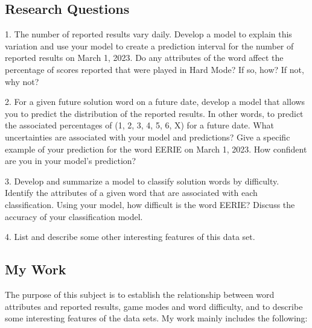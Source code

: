 \documentclass[
  journal=medium,
  manuscript=Report,
  year=2023,
  volume=37,
]{cup-journal}
\begin{document}
\subsection{Research Questions}
    
1. The number of reported results vary daily. Develop a model to explain this variation and use your model to create a prediction interval for the number of reported results on March 1, 2023. Do any attributes of the word affect the percentage of scores reported that were played in Hard Mode? If so, how? If not, why not?

2. For a given future solution word on a future date, develop a model that allows you to predict the distribution of the reported results. In other words, to predict the associated percentages of (1, 2, 3, 4, 5, 6, X) for a future date. What uncertainties are associated with your model and predictions? Give a specific example of your prediction for the word EERIE on March 1, 2023. How confident are you in your model’s prediction?

3. Develop and summarize a model to classify solution words by difficulty. Identify the attributes of a given word that are associated with each classification. Using your model, how difficult is the word EERIE? Discuss the accuracy of your classification model.

4. List and describe some other interesting features of this data set.

\subsection{My Work}

The purpose of this subject is to establish the relationship between word attributes and reported results, game modes and word difficulty, and to describe some interesting features of the data sets. My work mainly includes the following:
\end{document}
